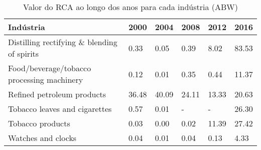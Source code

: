 \begin{table}
\centering
\caption{Valor do RCA ao longo dos anos para cada indústria (ABW)}
\begin{tabular}{p{6cm}p{1.5cm}p{1.5cm}p{1.5cm}p{1.5cm}p{1.5cm}}
\toprule
                                  Indústria &  2000 &  2004 &  2008 &  2012 &  2016 \\
\midrule
Distilling rectifying \& blending of spirits &  0.33 &  0.05 &  0.39 &  8.02 & 83.53 \\
 Food/beverage/tobacco processing machinery &  0.12 &  0.01 &  0.35 &  0.44 & 11.37 \\
                 Refined petroleum products & 36.48 & 40.09 & 24.11 & 13.33 & 20.63 \\
              Tobacco leaves and cigarettes &  0.57 &  0.01 &     - &     - & 26.30 \\
                           Tobacco products &  0.03 &  0.00 &  0.02 & 11.39 & 27.42 \\
                         Watches and clocks &  0.04 &  0.01 &  0.04 &  0.13 &  4.33 \\
\bottomrule
\end{tabular}
\end{table}
